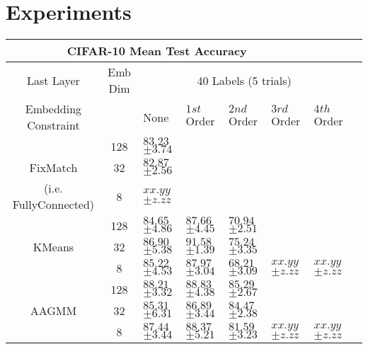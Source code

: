 \documentclass[10pt,twocolumn,letterpaper]{article}
\begin{document}
\section{Experiments}


\begin{table*}[ht!]
	\begin{tabularx}{\textwidth}{c|c|XXXXXX}
		\multicolumn{6}{c}{CIFAR-10 Mean Test Accuracy} \\ \hline\hline
		Last Layer &   Emb Dim   & \multicolumn{5}{c}{40 Labels (5 trials)}            \\ 
		\hline
		Embedding Constraint  &  & None & $1st$ Order & $2nd$ Order & $3rd$ Order & $4th$ Order  \\ 
		\hline
		& 128  & $83.23$ \scriptsize{$\pm 3.74$}   &  &  &  &   \\
		FixMatch\cite{sohn2020fixmatch} & 32  & $82.87$ \scriptsize{$\pm 2.56$}    &  &  &  &   \\
		(i.e. FullyConnected) & 8  & $xx.yy$ \scriptsize{$\pm z.zz$}      &  &  &  &   \\
		\hline
		& 128  & $84.65$ \scriptsize{$\pm 4.86$}    & $87.66$ \scriptsize{$\pm 4.45$} & $70.94$ \scriptsize{$\pm 2.51$} &  &  \\
		KMeans & 32  & $86.90$ \scriptsize{$\pm 5.38$}    & $\boldsymbol{91.58}$ \scriptsize{$\pm 1.39$} & $75.24$ \scriptsize{$\pm 3.35$} &  &  \\
		& 8  & $85.22$ \scriptsize{$\pm 4.53$}    & $87.97$ \scriptsize{$\pm 3.04$} & $68.21$ \scriptsize{$\pm 3.09$} & $xx.yy$ \scriptsize{$\pm z.zz$} & $xx.yy$ \scriptsize{$\pm z.zz$}  \\
		\hline
		& 128  & $88.21$ \scriptsize{$\pm 3.32$}    & $88.83$ \scriptsize{$\pm 4.38$} & $85.29$ \scriptsize{$\pm 2.67$} &  &  \\
		AAGMM  & 32  & $85.31$ \scriptsize{$\pm 6.31$}    & $86.89$ \scriptsize{$\pm 3.44$} & $84.47$ \scriptsize{$\pm 2.38$} &  &  \\
		& 8  & $87.44$ \scriptsize{$\pm 3.44$}    & $88.37$ \scriptsize{$\pm 5.21$} & $81.59$ \scriptsize{$\pm 3.23$} & $xx.yy$ \scriptsize{$\pm z.zz$} & $xx.yy$ \scriptsize{$\pm z.zz$} \\
		

\end{tabularx}
\end{table*}
\end{document}
